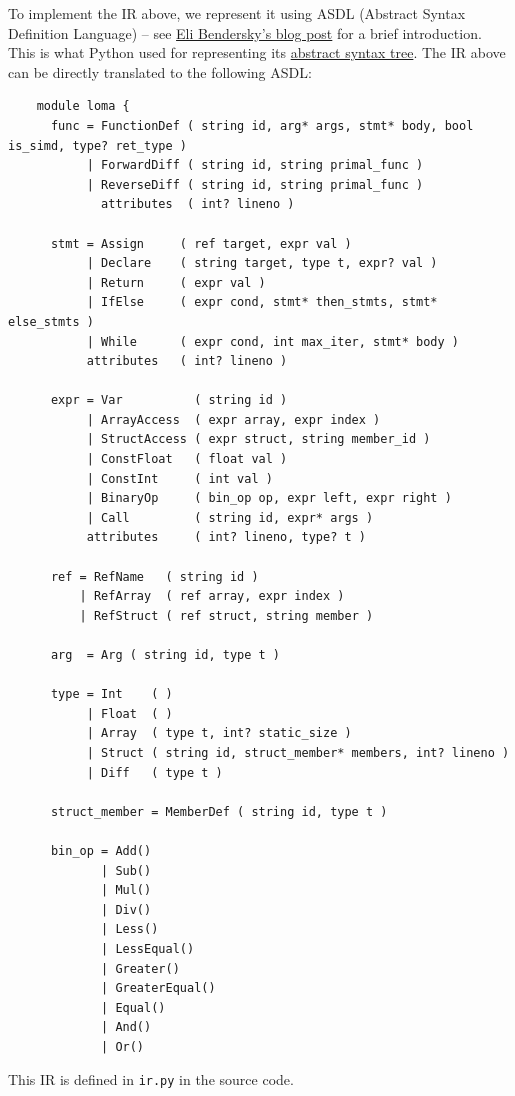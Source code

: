 To implement the IR above, we represent it using ASDL (Abstract Syntax Definition Language) -- see \href{https://eli.thegreenplace.net/2014/06/04/using-asdl-to-describe-asts-in-compilers}{Eli Bendersky's blog post} for a brief introduction. This is what Python used for representing its \href{https://github.com/python/cpython/blob/main/Parser/Python.asdl}{abstract syntax tree}. The IR above can be directly translated to the following ASDL:
\begin{lstlisting}
    module loma {
      func = FunctionDef ( string id, arg* args, stmt* body, bool is_simd, type? ret_type )
           | ForwardDiff ( string id, string primal_func )
           | ReverseDiff ( string id, string primal_func )
             attributes  ( int? lineno )

      stmt = Assign     ( ref target, expr val )
           | Declare    ( string target, type t, expr? val )
           | Return     ( expr val )
           | IfElse     ( expr cond, stmt* then_stmts, stmt* else_stmts )
           | While      ( expr cond, int max_iter, stmt* body )
           attributes   ( int? lineno )

      expr = Var          ( string id )
           | ArrayAccess  ( expr array, expr index )
           | StructAccess ( expr struct, string member_id )
           | ConstFloat   ( float val )
           | ConstInt     ( int val )
           | BinaryOp     ( bin_op op, expr left, expr right )
           | Call         ( string id, expr* args )
           attributes     ( int? lineno, type? t )

      ref = RefName   ( string id )
          | RefArray  ( ref array, expr index )
          | RefStruct ( ref struct, string member )

      arg  = Arg ( string id, type t )

      type = Int    ( )
           | Float  ( )
           | Array  ( type t, int? static_size )
           | Struct ( string id, struct_member* members, int? lineno )
           | Diff   ( type t )

      struct_member = MemberDef ( string id, type t )

      bin_op = Add()
             | Sub()
             | Mul()
             | Div()
             | Less()
             | LessEqual()
             | Greater()
             | GreaterEqual()
             | Equal()
             | And()
             | Or()

\end{lstlisting}
This IR is defined in \lstinline{ir.py} in the source code.

